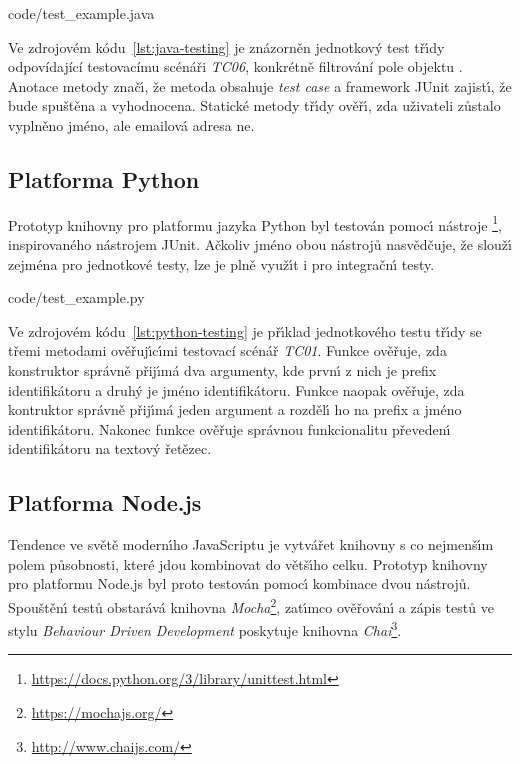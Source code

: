 
{code/test_example.java}

Ve zdrojovém kódu~\ref{lst:java-testing} je znázorněn jednotkov\'y test
tř\'{\i}dy  odpovídající testovacímu scénáři \textit{TC06}, konkrétně
filtrování pole  objektu . Anotace  metody  znač\'{\i},
že metoda obsahuje \textit{test case} a framework JUnit zajist\'{\i}, že bude spuštěna
a vyhodnocena. Statické metody tř\'{\i}dy  ověř\'{\i}, zda uživateli zůstalo
vyplněno jméno, ale emailová adresa ne.

\subsection{Platforma Python}

Prototyp knihovny pro platformu jazyka Python byl testován pomoc\'{\i}
nástroje \footnote{\url{https://docs.python.org/3/library/unittest.html}}, inspirovaného nástrojem
JUnit. Ačkoliv jméno obou nástrojů nasvědčuje, že slouž\'{\i} zejména pro jednotkové testy,
lze je plně využ\'{\i}t i pro integračn\'{\i} testy.


{code/test_example.py}

Ve zdrojovém kódu~\ref{lst:python-testing} je př\'{\i}klad jednotkového testu tř\'{\i}dy
 se třemi metodami ověřuj\'{\i}c\'{\i}mi testovací scénář \textit{TC01}.
Funkce  ověřuje, zda konstruktor správně přij\'{\i}má dva argumenty,
kde prvn\'{\i} z nich je prefix identifikátoru a druh\'y je jméno identifikátoru.
Funkce  naopak ověřuje, zda kontruktor správně přij\'{\i}má jeden
argument a rozděl\'{\i} ho na prefix a jméno identifikátoru.
Nakonec funkce  ověřuje správnou funkcionalitu převeden\'{\i}
identifikátoru na textov\'y řetězec.

\subsection{Platforma Node.js}

Tendence ve světě modern\'{\i}ho JavaScriptu je vytvářet knihovny s co nejmenš\'{\i}m polem působnosti,
které jdou kombinovat do větš\'{\i}ho celku. Prototyp knihovny pro platformu Node.js byl proto testován pomoc\'{\i}
kombinace dvou nástrojů. Spouštěn\'{\i} testů obstarává knihovna \textit{Mocha}\footnote{\url{https://mochajs.org/}}, zat\'{\i}mco
ověřován\'{\i} a zápis testů ve stylu \textit{Behaviour Driven Development} poskytuje knihovna \textit{Chai}\footnote{\url{http://www.chaijs.com/}}.

